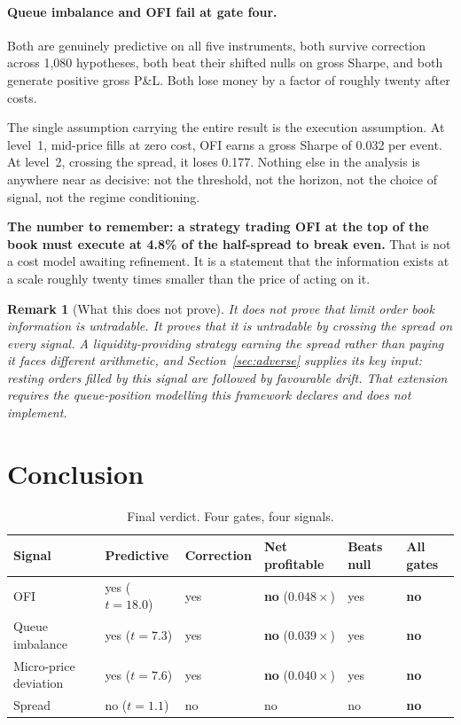 \documentclass[11pt]{scrartcl}
\newtheorem{remark}{Remark}[section]
\begin{document}
\paragraph{Queue imbalance and OFI fail at gate four.} Both are genuinely predictive on all five instruments, both survive correction across 1{,}080 hypotheses, both beat their shifted nulls on gross Sharpe, and both generate positive gross P\&L. Both lose money by a factor of roughly twenty after costs.

The single assumption carrying the entire result is the execution assumption. At level~1, mid-price fills at zero cost, OFI earns a gross Sharpe of 0.032 per event. At level~2, crossing the spread, it loses 0.177. Nothing else in the analysis is anywhere near as decisive: not the threshold, not the horizon, not the choice of signal, not the regime conditioning.

\textbf{The number to remember: a strategy trading OFI at the top of the book must execute at 4.8\% of the half-spread to break even.} That is not a cost model awaiting refinement. It is a statement that the information exists at a scale roughly twenty times smaller than the price of acting on it.

\begin{remark}[What this does not prove]
\label{rem:notprove}
It does not prove that limit order book information is untradable. It proves that it is untradable \emph{by crossing the spread on every signal}. A liquidity-providing strategy earning the spread rather than paying it faces different arithmetic, and Section~\ref{sec:adverse} supplies its key input: resting orders filled by this signal are followed by favourable drift. That extension requires the queue-position modelling this framework declares and does not implement.
\end{remark}

\section{Conclusion}
\label{sec:conclusion}

\begin{table}[H]
\centering
\caption{Final verdict. Four gates, four signals.}
\label{tab:verdict}
\begin{tabular}{lllll>{\bfseries}l}
\toprule
Signal & Predictive & Correction & Net profitable & Beats null & All gates \\
\midrule
OFI                   & yes ($t=18.0$) & yes & \textbf{no} ($0.048\times$) & yes & no \\
Queue imbalance       & yes ($t=7.3$)  & yes & \textbf{no} ($0.039\times$) & yes & no \\
Micro-price deviation & yes ($t=7.6$)  & yes & \textbf{no} ($0.040\times$) & yes & no \\
Spread                & no ($t=1.1$)   & no  & no & no & no \\
\bottomrule
\end{tabular}
\end{table}
\end{document}
